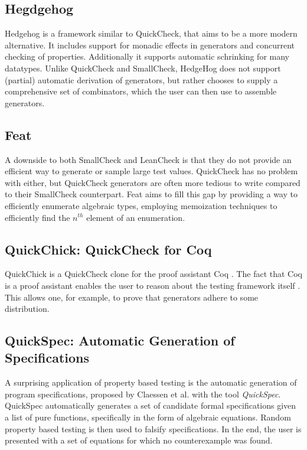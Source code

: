 \documentclass[a4paper,msc,twosized=semi]{uustthesis}
\begin{document}
\subsection{Hegdgehog} 
  
  Hedgehog \cite{hedgehog} is a framework similar to QuickCheck, that aims to be a 
  more modern alternative. It includes support for monadic effects in generators and 
  concurrent checking of properties. Additionally it supports automatic schrinking for many datatypes. Unlike QuickCheck and SmallCheck, HedgeHog does not support (partial) automatic derivation of generators, but rather chooses to supply a comprehensive set of combinators, which the user can then use to assemble generators.

\subsection{Feat} 
  
  A downside to both SmallCheck and LeanCheck is that they do not provide an efficient 
  way to generate or sample large test values. QuickCheck has no problem with either, 
  but QuickCheck generators are often more tedious to write compared to their 
  SmallCheck counterpart. Feat \cite{duregaard2013feat} aims to fill this gap by 
  providing a way to efficiently enumerate algebraic types, employing memoization 
  techniques to efficiently find the $n^{th}$ element of an enumeration. 

\subsection{QuickChick: QuickCheck for Coq} 
  
  QuickChick is a QuickCheck clone for the proof assistant Coq \cite
  {denes2014quickchick}. The fact that Coq is a proof assistant enables the user to 
  reason about the testing framework itself \cite{paraskevopoulou2015foundational}. 
  This allows one, for example, to prove that generators adhere to some distribution. 

\subsection{QuickSpec: Automatic Generation of Specifications}

  A surprising application of property based testing is the automatic generation of 
  program specifications, proposed by Claessen et al. \cite{claessen2010quickspec} 
  with the tool \textit{QuickSpec}. QuickSpec automatically generates a set of 
  candidate formal specifications given a list of pure functions, specifically in the 
  form of algebraic equations. Random property based testing is then used to falsify 
  specifications. In the end, the user is presented with a set of equations for which 
  no counterexample was found.  
\end{document}
